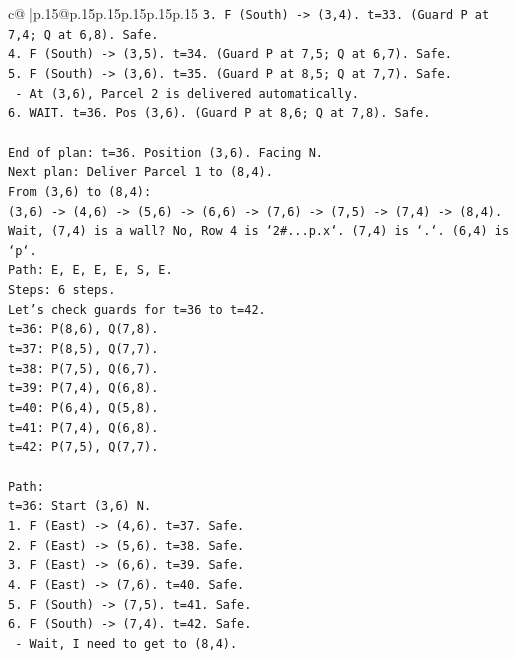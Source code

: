 \documentclass{article}
\begin{document}
{\begin{supertabular}{c@{$\;$}|p{.15\linewidth}@{}p{.15\linewidth}p{.15\linewidth}p{.15\linewidth}p{.15\linewidth}p{.15\linewidth}}
{{{\texttt{3. F (South) {-}> (3,4). t=33. (Guard P at 7,4; Q at 6,8). Safe.} \\
\texttt{4. F (South) {-}> (3,5). t=34. (Guard P at 7,5; Q at 6,7). Safe.} \\
\texttt{5. F (South) {-}> (3,6). t=35. (Guard P at 8,5; Q at 7,7). Safe.} \\
\texttt{   {-} At (3,6), Parcel 2 is delivered automatically.} \\
\texttt{6. WAIT. t=36. Pos (3,6). (Guard P at 8,6; Q at 7,8). Safe.} \\
\\ 
\texttt{End of plan: t=36. Position (3,6). Facing N.} \\
\texttt{Next plan: Deliver Parcel 1 to (8,4).} \\
\texttt{From (3,6) to (8,4):} \\
\texttt{(3,6) {-}> (4,6) {-}> (5,6) {-}> (6,6) {-}> (7,6) {-}> (7,5) {-}> (7,4) {-}> (8,4).} \\
\texttt{Wait, (7,4) is a wall? No, Row 4 is `2\#...p.x`. (7,4) is `.`. (6,4) is `p`.} \\
\texttt{Path: E, E, E, E, S, E.} \\
\texttt{Steps: 6 steps.} \\
\texttt{Let's check guards for t=36 to t=42.} \\
\texttt{t=36: P(8,6), Q(7,8).} \\
\texttt{t=37: P(8,5), Q(7,7).} \\
\texttt{t=38: P(7,5), Q(6,7).} \\
\texttt{t=39: P(7,4), Q(6,8).} \\
\texttt{t=40: P(6,4), Q(5,8).} \\
\texttt{t=41: P(7,4), Q(6,8).} \\
\texttt{t=42: P(7,5), Q(7,7).} \\
\\ 
\texttt{Path:} \\
\texttt{t=36: Start (3,6) N.} \\
\texttt{1. F (East) {-}> (4,6). t=37. Safe.} \\
\texttt{2. F (East) {-}> (5,6). t=38. Safe.} \\
\texttt{3. F (East) {-}> (6,6). t=39. Safe.} \\
\texttt{4. F (East) {-}> (7,6). t=40. Safe.} \\
\texttt{5. F (South) {-}> (7,5). t=41. Safe.} \\
\texttt{6. F (South) {-}> (7,4). t=42. Safe.} \\
\texttt{   {-} Wait, I need to get to (8,4).} \\
}}}
\end{supertabular}}
\end{document}
